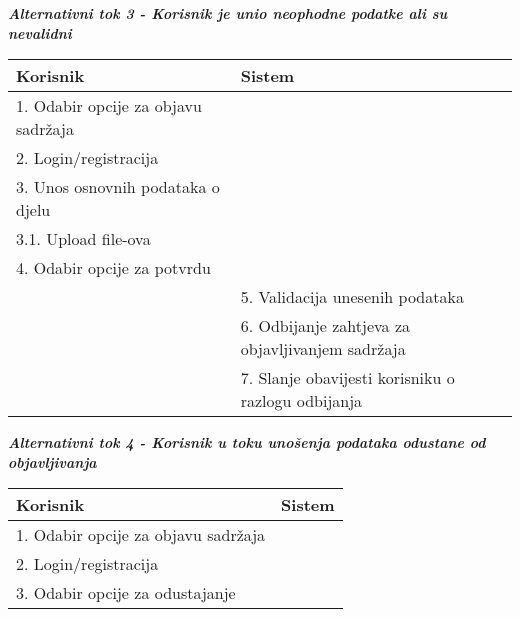\documentclass[12pt, a4paper]{report}
\begin{document}
\begin{flushleft}
\textbf{\textit{Alternativni tok 3 - Korisnik je unio neophodne podatke ali su nevalidni}}

\begin{tabular}{|m{7cm}|m{7cm}|}
\hline
\textbf{Korisnik} & \textbf{Sistem} \\
\hline
1. Odabir opcije za objavu sadržaja &  \\
\hline
2. Login/registracija &  \\
\hline
3. Unos osnovnih podataka o djelu &  \\
\hline
3.1. Upload file-ova &  \\
\hline
4. Odabir opcije za potvrdu &  \\
\hline
 & 5. Validacija unesenih podataka \\
\hline
 & 6. Odbijanje zahtjeva za objavljivanjem sadržaja \\
\hline
 & 7. Slanje obavijesti korisniku o razlogu odbijanja \\
 \hline
\end{tabular} \newline \newline

\textbf{\textit{Alternativni tok 4 - Korisnik u toku unošenja podataka odustane od objavljivanja}} \\
\begin{tabular}{|m{7cm}|m{7cm}|}
\hline
\textbf{Korisnik} & \textbf{Sistem} \\
\hline
1. Odabir opcije za objavu sadržaja &  \\
\hline
2. Login/registracija &  \\
\hline
3. Odabir opcije za odustajanje &  \\
\hline
\end{tabular}


\end{flushleft}
\end{document}
